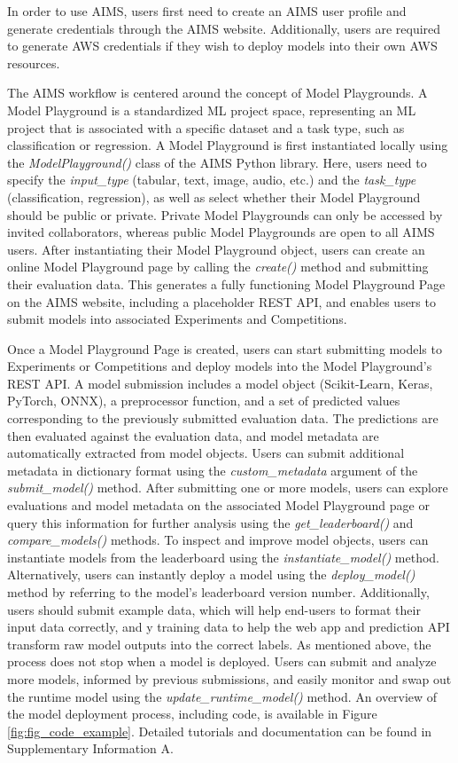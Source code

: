 In order to use AIMS, users first need to create an AIMS user profile and generate credentials through the AIMS website. Additionally, users are required to generate AWS credentials if they wish to deploy models into their own AWS resources. 

The AIMS workflow is centered around the concept of Model Playgrounds. A Model Playground is a standardized ML project space, representing an ML project that is associated with a specific dataset and a task type, such as classification or regression. A Model Playground is first instantiated locally using the \textit{ModelPlayground()} class of the AIMS Python library. Here, users need to specify the \textit{input\_type} (tabular, text, image, audio, etc.) and the \textit{task\_type} (classification, regression), as well as select whether their Model Playground should be public or private. Private Model Playgrounds can only be accessed by invited collaborators, whereas public Model Playgrounds are open to all AIMS users. After instantiating their Model Playground object, users can create an online Model Playground page by calling the \textit{create()} method and submitting their evaluation data. This generates a fully functioning Model Playground Page on the AIMS website, including a placeholder REST API, and enables users to submit models into associated Experiments and Competitions. 

Once a Model Playground Page is created, users can start submitting models to Experiments or Competitions and deploy models into the Model Playground’s REST API. A model submission includes a model object (Scikit-Learn, Keras, PyTorch, ONNX), a preprocessor function, and a set of predicted values corresponding to the previously submitted evaluation data. The predictions are then evaluated against the evaluation data, and model metadata are automatically extracted from model objects. Users can submit additional metadata in dictionary format using the \textit{custom\_metadata} argument of the \textit{submit\_model()} method. After submitting one or more models, users can explore evaluations and model metadata on the associated Model Playground page or query this information for further analysis using the \textit{get\_leaderboard()} and \textit{compare\_models()} methods. To inspect and improve model objects, users can instantiate models from the leaderboard using the \textit{instantiate\_model()} method. Alternatively, users can instantly deploy a model using the \textit{deploy\_model()} method by referring to the model’s leaderboard version number. Additionally, users should submit example data, which will help end-users to format their input data correctly, and y training data to help the web app and prediction API transform raw model outputs into the correct labels. As mentioned above, the process does not stop when a model is deployed. Users can submit and analyze more models, informed by previous submissions, and easily monitor and swap out the runtime model using the \textit{update\_runtime\_model()} method. An overview of the model deployment process, including code, is available in Figure \ref{fig:fig_code_example}. Detailed tutorials and documentation can be found in Supplementary Information A.

